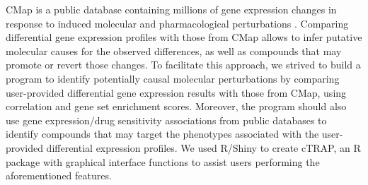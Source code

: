 
CMap is a public database containing millions of gene expression changes in response to induced molecular and pharmacological perturbations \cite{subramanian:2017ul}. Comparing differential gene expression profiles with those from CMap allows to infer putative molecular causes for the observed differences, as well as compounds that may promote or revert those changes. To facilitate this approach, we strived to build a program to identify potentially causal molecular perturbations by comparing user-provided differential gene expression results with those from CMap, using correlation and gene set enrichment scores. Moreover, the program should also use gene expression/drug sensitivity associations from public databases to identify compounds that may target the phenotypes associated with the user-provided differential expression profiles. We used R/Shiny to create cTRAP, an R package with graphical interface functions to assist users performing the aforementioned features.




